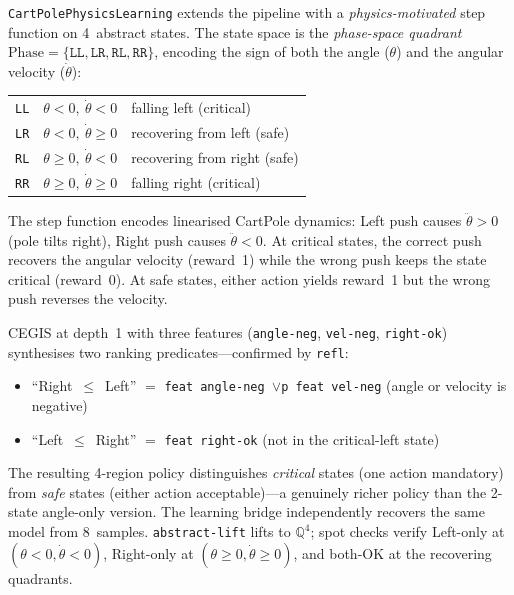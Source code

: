 \documentclass[9pt,a4paper]{article}
\theoremstyle{plain}
\theoremstyle{definition}
\theoremstyle{remark}
\begin{document}
\texttt{CartPolePhysicsLearning} extends the pipeline with a \emph{physics-motivated} step function on 4~abstract states.  The state space is the \emph{phase-space quadrant} $\text{Phase} = \{\texttt{LL}, \texttt{LR}, \texttt{RL}, \texttt{RR}\}$, encoding the sign of both the angle ($\theta$) and the angular velocity ($\dot\theta$):

\smallskip
\begin{center}
\begin{tabular}{lll}
\texttt{LL} & $\theta < 0,\ \dot\theta < 0$ & falling left (critical) \\
\texttt{LR} & $\theta < 0,\ \dot\theta \ge 0$ & recovering from left (safe) \\
\texttt{RL} & $\theta \ge 0,\ \dot\theta < 0$ & recovering from right (safe) \\
\texttt{RR} & $\theta \ge 0,\ \dot\theta \ge 0$ & falling right (critical)
\end{tabular}
\end{center}
\smallskip

The step function encodes linearised CartPole dynamics: Left push causes $\ddot\theta > 0$ (pole tilts right), Right push causes $\ddot\theta < 0$.  At critical states, the correct push recovers the angular velocity (reward~1) while the wrong push keeps the state critical (reward~0).  At safe states, either action yields reward~1 but the wrong push reverses the velocity.

CEGIS at depth~1 with three features (\texttt{angle-neg}, \texttt{vel-neg}, \texttt{right-ok}) synthesises two ranking predicates---confirmed by \texttt{refl}:
\begin{itemize}
\item ``Right~$\le$~Left'' $=$ \texttt{feat~angle-neg~$\vee$p~feat~vel-neg} (angle or velocity is negative)
\item ``Left~$\le$~Right'' $=$ \texttt{feat~right-ok} (not in the critical-left state)
\end{itemize}

The resulting 4-region policy distinguishes \emph{critical} states (one action mandatory) from \emph{safe} states (either action acceptable)---a genuinely richer policy than the 2-state angle-only version.  The learning bridge independently recovers the same model from 8~samples.  \texttt{abstract-lift} lifts to $\mathbb{Q}^4$; spot checks verify Left-only at $(\theta{<}0,\dot\theta{<}0)$, Right-only at $(\theta{\ge}0,\dot\theta{\ge}0)$, and both-OK at the recovering quadrants.
\end{document}
